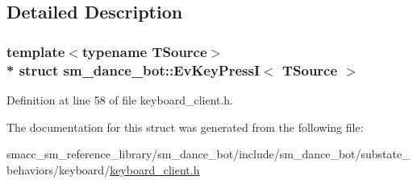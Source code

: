 \subsection{Detailed Description}
\subsubsection*{template$<$typename T\+Source$>$\\*
struct sm\+\_\+dance\+\_\+bot\+::\+Ev\+Key\+Press\+I$<$ T\+Source $>$}



Definition at line 58 of file keyboard\+\_\+client.\+h.



The documentation for this struct was generated from the following file\+:\begin{DoxyCompactItemize}
\item 
smacc\+\_\+sm\+\_\+reference\+\_\+library/sm\+\_\+dance\+\_\+bot/include/sm\+\_\+dance\+\_\+bot/substate\+\_\+behaviors/keyboard/\hyperlink{keyboard__client_8h}{keyboard\+\_\+client.\+h}\end{DoxyCompactItemize}
